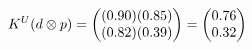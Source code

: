 \documentclass[preview]{standalone}
\begin{document}
\begin{align*}
\special{dvisvgm:raw <g id='unique000'>}K^U(d \otimes p) = \begin{pmatrix} (0.90)(0.85) \\ (0.82)(0.39) \end{pmatrix} = \begin{pmatrix} 0.76 \\ 0.32 \end{pmatrix}\special{dvisvgm:raw </g>}
\end{align*}
\end{document}
